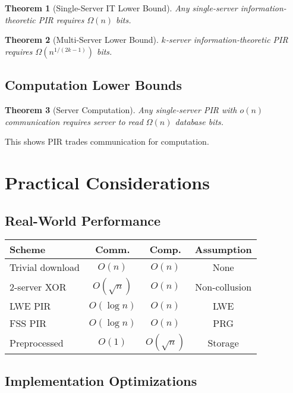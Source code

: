 \documentclass[11pt,final]{article}
\newtheorem{theorem}{Theorem}[section]
\begin{document}
\begin{theorem}[Single-Server IT Lower Bound]
Any single-server information-theoretic PIR requires $\Omega(n)$ bits.
\end{theorem}

\begin{theorem}[Multi-Server Lower Bound]
$k$-server information-theoretic PIR requires $\Omega(n^{1/(2k-1)})$ bits.
\end{theorem}

\subsection{Computation Lower Bounds}

\begin{theorem}[Server Computation]
Any single-server PIR with $o(n)$ communication requires server to read $\Omega(n)$ database bits.
\end{theorem}

This shows PIR trades communication for computation.

\section{Practical Considerations}

\subsection{Real-World Performance}

\begin{center}
\begin{tabular}{lccc}
\toprule
\textbf{Scheme} & \textbf{Comm.} & \textbf{Comp.} & \textbf{Assumption} \\
\midrule
Trivial download & $O(n)$ & $O(n)$ & None \\
2-server XOR & $O(\sqrt{n})$ & $O(n)$ & Non-collusion \\
LWE PIR & $O(\log n)$ & $O(n)$ & LWE \\
FSS PIR & $O(\log n)$ & $O(n)$ & PRG \\
Preprocessed & $O(1)$ & $O(\sqrt{n})$ & Storage \\
\bottomrule
\end{tabular}
\end{center}

\subsection{Implementation Optimizations}
\end{document}
